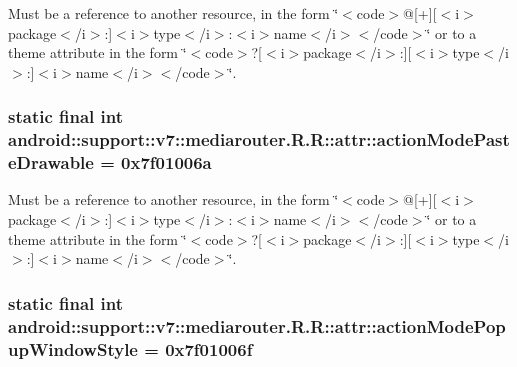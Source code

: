 Must be a reference to another resource, in the form \char`\"{}$<$code$>$@\mbox{[}+\mbox{]}\mbox{[}$<$i$>$package$<$/i$>$:\mbox{]}$<$i$>$type$<$/i$>$:$<$i$>$name$<$/i$>$$<$/code$>$\char`\"{} or to a theme attribute in the form \char`\"{}$<$code$>$?\mbox{[}$<$i$>$package$<$/i$>$:\mbox{]}\mbox{[}$<$i$>$type$<$/i$>$:\mbox{]}$<$i$>$name$<$/i$>$$<$/code$>$\char`\"{}. \hypertarget{classandroid_1_1support_1_1v7_1_1mediarouter_1_1_r_1_1attr_c82f6323ac9d937078fdff3811f769e2}{
\subsubsection[{actionModePasteDrawable}]{\setlength{\rightskip}{0pt plus 5cm}static final int android::support::v7::mediarouter.R.R::attr::actionModePasteDrawable = 0x7f01006a}}
\label{classandroid_1_1support_1_1v7_1_1mediarouter_1_1_r_1_1attr_c82f6323ac9d937078fdff3811f769e2}


Must be a reference to another resource, in the form \char`\"{}$<$code$>$@\mbox{[}+\mbox{]}\mbox{[}$<$i$>$package$<$/i$>$:\mbox{]}$<$i$>$type$<$/i$>$:$<$i$>$name$<$/i$>$$<$/code$>$\char`\"{} or to a theme attribute in the form \char`\"{}$<$code$>$?\mbox{[}$<$i$>$package$<$/i$>$:\mbox{]}\mbox{[}$<$i$>$type$<$/i$>$:\mbox{]}$<$i$>$name$<$/i$>$$<$/code$>$\char`\"{}. \hypertarget{classandroid_1_1support_1_1v7_1_1mediarouter_1_1_r_1_1attr_95dfa2ee4b0852a24c510b1adca81f70}{
\subsubsection[{actionModePopupWindowStyle}]{\setlength{\rightskip}{0pt plus 5cm}static final int android::support::v7::mediarouter.R.R::attr::actionModePopupWindowStyle = 0x7f01006f}}
\label{classandroid_1_1support_1_1v7_1_1mediarouter_1_1_r_1_1attr_95dfa2ee4b0852a24c510b1adca81f70}


